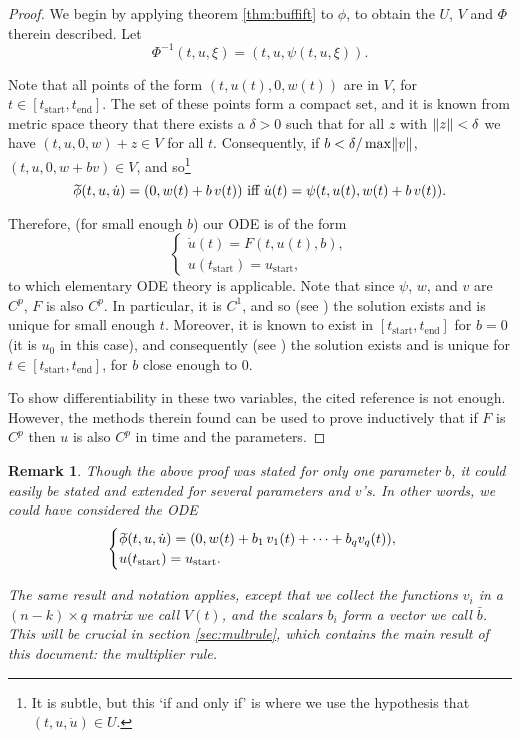 \documentclass{article}
\theoremstyle{plain}
\theoremstyle{plain}
\newtheorem{remark}{Remark}
\theoremstyle{nonumberplain}
\newtheorem{proof}{Proof}
\theoremstyle{empty}
\newcommand{\tstart}{\mathrm{start}}
\newcommand{\tend}{\mathrm{end}}
\newcommand{\wtphi}{
  \mspace{2mu}
  \widetilde{\mspace{-2mu}\smash[t]{\phi}}
}
\DeclarePairedDelimiter\norm{\lVert}{\rVert}
\newcommand{\vecb}{{\bar{b}}}
\begin{document}
\begin{proof}
We begin by applying theorem \ref{thm:buffift} to $\phi$, to obtain the $U$, $V$ and $\Phi$ therein described. Let
\[\Phi^{-1}(t,u,\xi) = (t,u,\psi(t,u,\xi)).\]

Note that all points of the form $(t,u(t),0,w(t))$ are in $V$, for $t \in [t_\tstart, t_\tend]$. The set of these points form a compact set, and it is known from metric space theory that there exists a $\delta > 0$ such that for all $z$ with $\norm z < \delta$ we have $(t,u,0,w) + z \in V$ for all $t$. Consequently, if $b < \delta / \max \norm v$, $(t,u,0,w+bv) \in V$, and so\footnote{It is subtle, but this `if and only if' is where we use the hypothesis that $(t,u,\dot u) \in U$.}
\[\wtphi(t, u, \dot u) = (0, w(t) + b\,v(t)) \text{ iff } \dot u(t) = \psi(t,u(t),w(t) + b\,v(t)).\]

Therefore, (for small enough $b$) our ODE is of the form
\[
\begin{cases}
\dot u(t) = F(t,u(t),b),\\
u(t_\tstart) = u_\tstart,
\end{cases}
\]
to which elementary ODE theory is applicable. Note that since $\psi$, $w$, and $v$ are $C^p$, $F$ is also $C^p$. In particular, it is $C^1$, and so (see \cite[p.74]{perko}) the solution exists and is unique for small enough $t$. Moreover, it is known to exist in $[t_\tstart, t_\tend]$ for $b = 0$ (it is $u_0$ in this case), and consequently (see \cite[thm.2,~p.84]{perko}) the solution exists and is unique for $t \in [t_\tstart,t_\tend]$, for $b$ close enough to 0.

To show differentiability in these two variables, the cited reference is not enough. However, the methods therein found can be used to prove inductively that if $F$ is $C^p$ then $u$ is also $C^p$ in time and the parameters.
\end{proof}

\begin{remark}\label{rmk:perturbation}
Though the above proof was stated for only one parameter $b$, it could easily be stated and extended for several parameters and $v$'s. In other words, we could have considered the ODE
\[
\begin{cases}
\wtphi(t, u, \dot u) = (0, w(t) + b_1\,v_1(t) + \dots + b_q v_q(t)),\\
u(t_\tstart) = u_\tstart.
\end{cases}
\]

The same result and notation applies, except that we collect the functions $v_i$ in a $(n-k) \times q$ matrix we call $V(t)$, and the scalars $b_i$ form a vector we call $\vecb$. This will be crucial in section \ref{sec:multrule}, which contains the main result of this document: the multiplier rule.
\end{remark}
\end{document}
